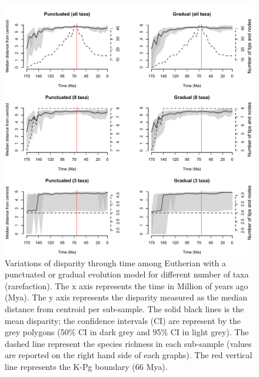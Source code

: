 \begin{figure}
\centering
    \includegraphics[keepaspectratio=true]{Supplementaries/Figures/STD/Rarefaction-beck.pdf}
\caption[Eutheria disparity (rarefied)]{Variations of disparity through time among Eutherian with a punctuated or gradual evolution model for different number of taxa (rarefaction). The x axis represents the time in Million of years ago (Mya). The y axis represents the disparity measured as the median distance from centroid per sub-sample. The solid black lines is the mean disparity; the confidence intervals (CI) are represent by the grey polygons (50\% CI in dark grey and 95\% CI in light grey). The dashed line represent the species richness in each sub-sample (values are reported on the right hand side of each graphs). The red vertical line represents the K-Pg boundary (66 Mya).}
\label{Supp_Eutheria_rarefied}
\end{figure}

